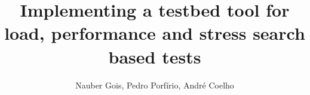 \documentclass[10pt,twocolumn]{article}
\begin{document}

\title{\vspace*{-.6in}Implementing a testbed tool for \\ load, performance and stress search based tests\vspace*{-.1in}}

\author{Nauber Gois, Pedro Porfírio, André Coelho
      }



\maketitle

\thispagestyle{doi}
\end{document}
